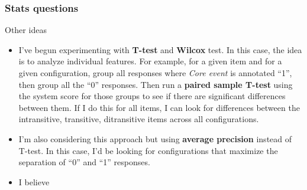 \documentclass[xcolor={dvipsnames}]{beamer}
\begin{document}
\begin{frame}
\frametitle{Stats questions}
\scriptsize

Other ideas

\begin{itemize}

\item I've begun experimenting with \textbf{T-test} and \textbf{Wilcox} test. In this case, the idea is to analyze individual features. For example, for a given item and for a given configuration, group all responses where \textit{Core event} is annotated ``1'', then group all the ``0'' responses. Then run a \textbf{paired sample T-test} using the system score for those groups to see if there are significant differences between them. If I do this for all items, I can look for differences between the intransitive, transitive, ditransitive items across all configurations.

\item I'm also considering this approach but using \textbf{average precision} instead of T-test. In this case, I'd be looking for configurations that maximize the separation of ``0'' and ``1'' responses.

\item I believe 


\end{itemize}

\end{frame}


%
%
\end{document}
